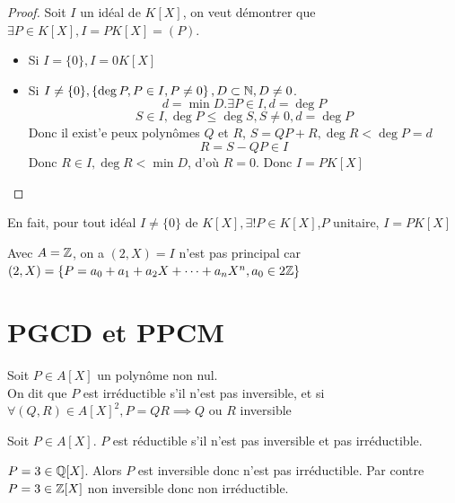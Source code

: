 \documentclass[]{report}
\begin{document}
    \begin{proof}
        Soit $I$ un idéal de $K[X]$, on veut démontrer que $\exists P\in K[X],I=PK[X]=(P)$.
        \begin{itemize}
            \item Si $I=\{0\},I=0 K[X]$
            \item Si $I\neq \{0\},\left\{\deg P,P\in I,P\neq 0 \right\},D\subset \mathbb{N},D\neq 0$.\\
            \[ d=\min D.\exists P\in I,d=\deg P\]
            \[S\in I,\deg P\le \deg S,S\neq 0,d=\deg P\]
            Donc il exist'e peux polynômes $Q$ et $R$, $S=QP+R,\deg R< \deg P=d$
            \[R=S-QP\in I\]
            Donc $R\in I,\deg R<\min D$, d'où $R=0$. Donc $I=PK[X]$
        \end{itemize}
    \end{proof}

    \begin{re}{}{}
        En fait, pour tout idéal $I\neq\{0\}$ de $K[X],\exists!P\in K[X]$,$P$ unitaire, \tq $I=P K[X]$
    \end{re}

    \begin{ex}{}{}
        Avec $A=\mathbb{Z}$, on a $(2,X)=I$ n'est pas principal car $(2,X)=\{P=a_0+a_1+a_2X+\dots+a_nX^n,a_0\in 2\mathbb{Z}\}$
    \end{ex}

    \section{PGCD et PPCM}

    \begin{df}{}{}
        Soit $P\in A[X]$ un polynôme non nul.\\
        On dit que $P$ est irréductible s'il n'est pas inversible, et si \\$\forall(Q,R)\in A[X]^2,P=QR\implies Q$ ou $R$ inversible
    \end{df}

    \begin{df}{}{}
        Soit $P\in A[X]$. $P$ est réductible s'il n'est pas inversible et pas irréductible.
    \end{df}

    \begin{ex}{}{}
        $P=3\in \mathbb{Q}[X]$. Alors $P$ est inversible donc n'est pas irréductible. Par contre $P=3\in \mathbb{Z}[X]$ non inversible donc non irréductible.
    \end{ex}
\end{document}
